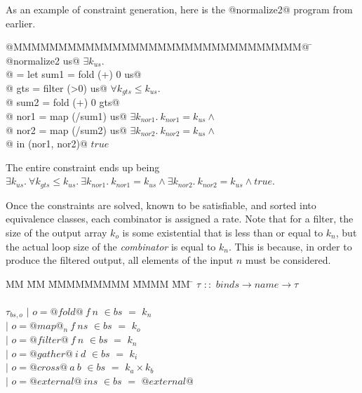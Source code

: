 As an example of constraint generation, here is the @normalize2@ program from earlier.
\begin{tabbing}
@MMMMMMMMMMMMMMMMMMMMMMMMMMMMMMMM@  \= \kill
@normalize2 us@                     \> $\exists k_{us}.$      \\
@ = let sum1 = fold   (+) 0 us@     \>                      \\
@       gts  = filter (>0)  us@     \> $\forall k_{gts} \le k_{us}.$ \\
@       sum2 = fold   (+) 0 gts@    \> \\
@       nor1 = map  (/sum1) us@     \> $\exists k_{nor1}.\ k_{nor1} = k_{us} \wedge$ \\
@       nor2 = map  (/sum2) us@     \> $\exists k_{nor2}.\ k_{nor2} = k_{us} \wedge$ \\
@   in (nor1, nor2)@                \> $true$ \\
\end{tabbing}
The entire constraint ends up being $\exists k_{us}.\ \forall k_{gts} \le k_{us}.\ \exists k_{nor1}.\ k_{nor1} = k_{us} \wedge \exists k_{nor2}.\ k_{nor2} = k_{us} \wedge true$.


Once the constraints are solved, known to be satisfiable, and sorted into equivalence classes, each combinator is assigned a rate.
Note that for a filter, the size of the output array $k_o$ is some existential that is less than or equal to $k_n$, but the actual loop size of the \emph{combinator} is equal to $k_n$.
This is because, in order to produce the filtered output, all elements of the input $n$ must be considered.

\begin{tabbing}
MM \= MM \= MMMMMMMMM \= MMMM \= MM \= \kill
$\tau$  \>$::$\> $binds \rightarrow name \rightarrow \tau$ \\
\\
$\tau_{bs,o}$    
            \> $|$ \> $o = @fold@~f~n$      \> $\in bs$ \> $=$ \> $k_n$ \\
            \> $|$ \> $o = @map@_n~f~ns$    \> $\in bs$ \> $=$ \> $k_o$ \\
            \> $|$ \> $o = @filter@~f~n$    \> $\in bs$ \> $=$ \> $k_n$ \\
            \> $|$ \> $o = @gather@~i~d$    \> $\in bs$ \> $=$ \> $k_i$ \\
            \> $|$ \> $o = @cross@~a~b$     \> $\in bs$ \> $=$ \> $k_a \times k_b$ \\
            \> $|$ \> $o = @external@~ins$  \> $\in bs$ \> $=$ \> $@external@$ \\
\end{tabbing}

